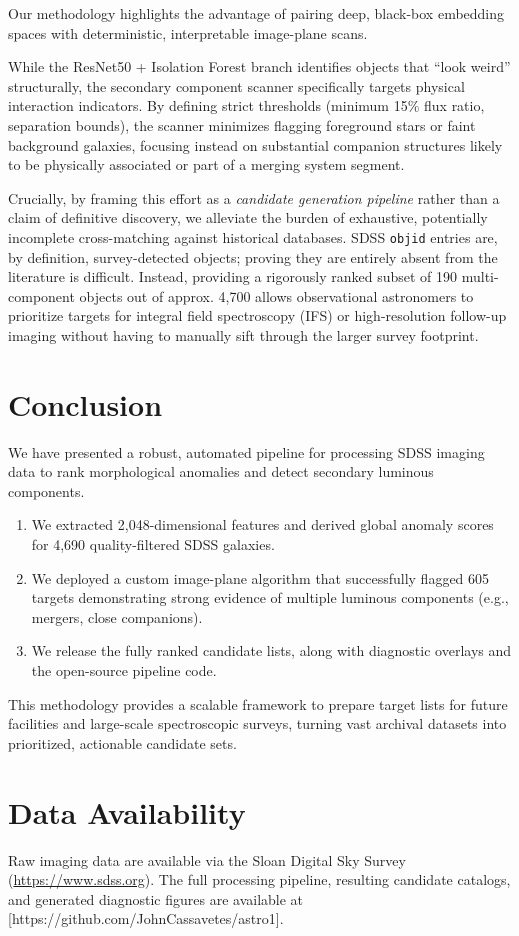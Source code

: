 \documentclass[twocolumn]{aastex631}
\begin{document}
Our methodology highlights the advantage of pairing deep, black-box embedding spaces with deterministic, interpretable image-plane scans. 

While the ResNet50 + Isolation Forest branch identifies objects that ``look weird'' structurally, the secondary component scanner specifically targets physical interaction indicators. By defining strict thresholds (minimum 15\% flux ratio, separation bounds), the scanner minimizes flagging foreground stars or faint background galaxies, focusing instead on substantial companion structures likely to be physically associated or part of a merging system segment.

Crucially, by framing this effort as a \textit{candidate generation pipeline} rather than a claim of definitive discovery, we alleviate the burden of exhaustive, potentially incomplete cross-matching against historical databases. SDSS \texttt{objid} entries are, by definition, survey-detected objects; proving they are entirely absent from the literature is difficult. Instead, providing a rigorously ranked subset of 190 multi-component objects out of approx. 4,700 allows observational astronomers to prioritize targets for integral field spectroscopy (IFS) or high-resolution follow-up imaging without having to manually sift through the larger survey footprint.

\section{Conclusion} \label{sec:conclusion}

We have presented a robust, automated pipeline for processing SDSS imaging data to rank morphological anomalies and detect secondary luminous components. 

\begin{enumerate}
    \item We extracted 2,048-dimensional features and derived global anomaly scores for 4,690 quality-filtered SDSS galaxies.
    \item We deployed a custom image-plane algorithm that successfully flagged 605 targets demonstrating strong evidence of multiple luminous components (e.g., mergers, close companions).
    \item We release the fully ranked candidate lists, along with diagnostic overlays and the open-source pipeline code.
\end{enumerate}

This methodology provides a scalable framework to prepare target lists for future facilities and large-scale spectroscopic surveys, turning vast archival datasets into prioritized, actionable candidate sets.

\section*{Data Availability}
Raw imaging data are available via the Sloan Digital Sky Survey (\url{https://www.sdss.org}). The full processing pipeline, resulting candidate catalogs, and generated diagnostic figures are available at [https://github.com/JohnCassavetes/astro1].



\end{document}
